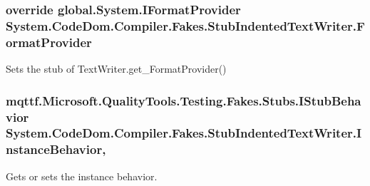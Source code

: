 \hypertarget{class_system_1_1_code_dom_1_1_compiler_1_1_fakes_1_1_stub_indented_text_writer_a418625e060326caab6830b7d7fe489a2}{
\subsubsection[{Format\-Provider}]{\setlength{\rightskip}{0pt plus 5cm}override global.\-System.\-I\-Format\-Provider System.\-Code\-Dom.\-Compiler.\-Fakes.\-Stub\-Indented\-Text\-Writer.\-Format\-Provider\hspace{0.3cm}{\ttfamily [get]}}}\label{class_system_1_1_code_dom_1_1_compiler_1_1_fakes_1_1_stub_indented_text_writer_a418625e060326caab6830b7d7fe489a2}


Sets the stub of Text\-Writer.\-get\-\_\-\-Format\-Provider()

\hypertarget{class_system_1_1_code_dom_1_1_compiler_1_1_fakes_1_1_stub_indented_text_writer_accdcf274a54b850ac33271a175d69175}{
\subsubsection[{Instance\-Behavior}]{\setlength{\rightskip}{0pt plus 5cm}mqttf.\-Microsoft.\-Quality\-Tools.\-Testing.\-Fakes.\-Stubs.\-I\-Stub\-Behavior System.\-Code\-Dom.\-Compiler.\-Fakes.\-Stub\-Indented\-Text\-Writer.\-Instance\-Behavior\hspace{0.3cm}{\ttfamily [get]}, {\ttfamily [set]}}}\label{class_system_1_1_code_dom_1_1_compiler_1_1_fakes_1_1_stub_indented_text_writer_accdcf274a54b850ac33271a175d69175}


Gets or sets the instance behavior.

